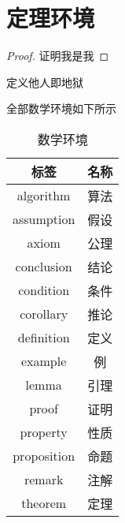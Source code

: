 \section{定理环境}

\begin{proof}
    证明我是我
\end{proof}

\begin{definition}[他人]
    定义他人即地狱
\end{definition}

全部数学环境如下所示

\begin{table}[htbp]
    \caption{数学环境}
    \label{tab:mathenv}
    \begin{tabular}{cc}
        \toprule
        标签 & 名称 \\
        \midrule
        algorithm & 算法 \\
        assumption & 假设 \\
        axiom & 公理 \\
        conclusion & 结论 \\
        condition & 条件 \\
        corollary & 推论 \\
        definition & 定义 \\
        example & 例 \\ 
        lemma & 引理 \\
        proof & 证明 \\
        property & 性质 \\
        proposition & 命题 \\
        remark & 注解 \\
        theorem & 定理 \\
        \bottomrule
    \end{tabular}
\end{table}
